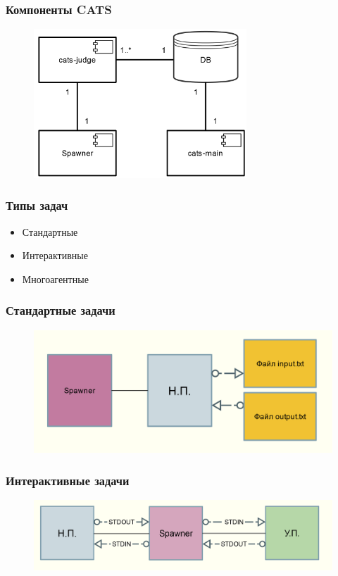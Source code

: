\documentclass{beamer}
\begin{document}
\begin{frame}
  \frametitle{Компоненты CATS}
  \begin{figure}[htb]
  \centering
  \includegraphics[width=8cm,keepaspectratio]{./img/cats.png}
  \end{figure}
\end{frame}

\begin{frame}
  \frametitle{Типы задач}
  \begin{itemize}
    \item Стандартные
    \item Интерактивные
    \item Многоагентные
  \end{itemize}
\end{frame}

\begin{frame}
  \frametitle{Стандартные задачи}
  \begin{figure}[htb]
  \centering
  \includegraphics[width=\textwidth,keepaspectratio]{./img/normal_data_flow.png}
  \end{figure}
\end{frame}

\begin{frame}
  \frametitle{Интерактивные задачи}
  \begin{figure}[htb]
  \centering
  \includegraphics[width=\textwidth,keepaspectratio]{./img/interactive_data_flow.png}
  \end{figure}
\end{frame}
\end{document}
